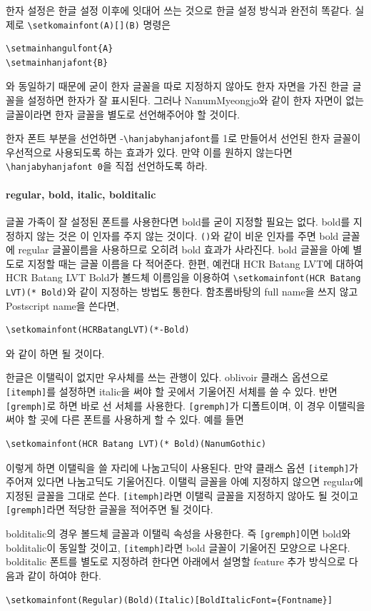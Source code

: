 \documentclass[
	12pt,
	a4paper,
	kosection,
	footnote,
	microtype,
	figtabcapt,
]{oblivoir}
\begin{document}
한자 설정은 한글 설정 이후에 잇대어 쓰는 것으로 한글 설정 방식과 완전히 똑같다.
실제로 \verb|\setkomainfont(A)[](B)| 명령은
\begin{verbatim}
\setmainhangulfont{A}
\setmainhanjafont{B}
\end{verbatim}
와 동일하기 때문에 굳이 한자 글꼴을 따로 지정하지 않아도 한자 자면을 가진 한글 글꼴을 설정하면
한자가 잘 표시된다.
그러나 NanumMyeongjo와 같이 한자 자면이 없는 글꼴이라면 한자 글꼴을 별도로 선언해주어야 할 
것이다.

한자 폰트 부분을 선언하면 \LuaTeX- \verb|\hanjabyhanjafont|를 1로 만들어서 선언된
한자 글꼴이 우선적으로 사용되도록 하는 효과가 있다. 만약 이를 원하지 않는다면 \verb|\hanjabyhanjafont 0|을
직접 선언하도록 하라.

\paragraph{regular, bold, italic, bolditalic}
글꼴 가족이 잘 설정된 폰트를 사용한다면 bold를 굳이 지정할 필요는 없다.
bold를 지정하지 않는 것은 이 인자를 주지 않는 것이다. \verb|()|와 같이 비운 인자를 주면
bold 글꼴에 regular 글꼴이름을 사용하므로 오히려 bold 효과가 사라진다.
bold 글꼴을 아예 별도로 지정할 때는 글꼴 이름을 다 적어준다. 한편, 예컨대
HCR Batang LVT에 대하여 HCR Batang LVT Bold가 볼드체 이름임을 이용하여
\verb|\setkomainfont(HCR Batang LVT)(* Bold)|와 같이 지정하는 방법도 통한다.
함초롬바탕의 full name을 쓰지 않고 Postscript name을 쓴다면,
\begin{verbatim}
\setkomainfont(HCRBatangLVT)(*-Bold)
\end{verbatim}
와 같이 하면 될 것이다.

한글은 이탤릭이 없지만 우사체를 쓰는 관행이 있다. oblivoir 클래스 옵션으로 \texttt{[itemph]}를
설정하면 italic을 써야 할 곳에서 기울어진 서체를 쓸 수 있다. 반면 \texttt{[gremph]}로 하면
바로 선 서체를 사용한다. \texttt{[gremph]}가 디폴트이며, 이 경우 이탤릭을 써야 할 곳에 다른
폰트를 사용하게 할 수 있다. 예를 들면
\begin{verbatim}
\setkomainfont(HCR Batang LVT)(* Bold)(NanumGothic)
\end{verbatim}
이렇게 하면 이탤릭을 쓸 자리에 나눔고딕이 사용된다. 만약 클래스 옵션 \texttt{[itemph]}가
주어져 있다면 나눔고딕도 기울어진다.
이탤릭 글꼴을 아예 지정하지 않으면 regular에 지정된 글꼴을 그대로 쓴다. \texttt{[itemph]}라면
이탤릭 글꼴을 지정하지 않아도 될 것이고 \texttt{[gremph]}라면 적당한 글꼴을 적어주면 될 것이다.

bolditalic의 경우 볼드체 글꼴과 이탤릭 속성을 사용한다. 즉 \texttt{[gremph]}이면 bold와
bolditalic이 동일할 것이고, \texttt{[itemph]}라면 bold 글꼴이 기울어진 모양으로 나온다.
bolditalic 폰트를 별도로 지정하려 한다면 아래에서 설명할 feature 추가 방식으로 다음과 같이 하여야 한다.
\begin{verbatim}
\setkomainfont(Regular)(Bold)(Italic)[BoldItalicFont={Fontname}]
\end{verbatim}
\end{document}
